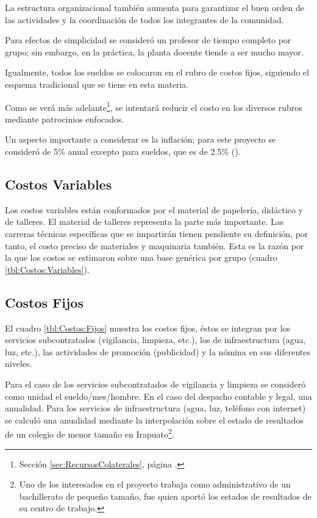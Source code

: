 La estructura organizacional también aumenta para garantizar el buen orden de las actividades y la coordinación de todos los integrantes de la comunidad.

Para efectos de simplicidad se consideró un profesor de tiempo completo por grupo; sin embargo, en la práctica, la planta docente tiende a ser mucho mayor.

Igualmente, todos los sueldos se colocaron en el rubro de costos fijos, siguiendo el esquema tradicional que se tiene en esta materia.

Como se verá más adelante\footnote{Sección \ref{sec:RecursosColaterales}, página \pageref{sec:RecursosColaterales}.}, se intentará reducir el costo en los diversos rubros mediante patrocinios enfocados.

Un aspecto importante a considerar es la inflación; para este proyecto se consideró de 5\% anual excepto para sueldos, que es de 2.5\% (\citep{BANXICO}).

\subsection{Costos Variables}

Los costos variables están conformados por el material de papelería, didáctico y de talleres. El material de talleres representa la parte más importante. Las carreras técnicas específicas que se impartirán tienen pendiente su definición, por tanto, el costo preciso de materiales y maquinaria también. Esta es la razón por la que los costos se estimaron sobre una base genérica por grupo (cuadro \ref{tbl:Costos:Variables}).



\subsection{Costos Fijos}

El cuadro \ref{tbl:Costos:Fijos} muestra los costos fijos, éstos se integran por los servicios subcontratados (vigilancia, limpieza, etc.), los de infraestructura (agua, luz, etc.), las actividades de promoción (publicidad) y la nómina en sus diferentes niveles.

Para el caso de los servicios subcontratados de vigilancia y limpieza se consideró como unidad el sueldo/mes/hombre. En el caso del despacho contable y legal, una anualidad. Para los servicios de infraestructura (agua, luz, teléfono con internet) se calculó una anualidad mediante la interpolación sobre el estado de resultados de un colegio de menor tamaño en Irapuato\footnote{Uno de los interesados en el proyecto trabaja como administrativo de un bachillerato de pequeño tamaño, fue quien aportó los estados de resultados de su centro de trabajo.}.

